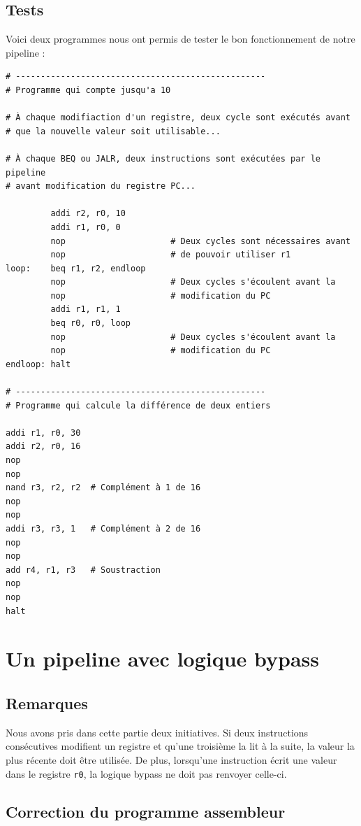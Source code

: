 \documentclass[a4paper]{article}
\begin{document}
\subsection{Tests}
Voici deux programmes nous ont permis de tester le bon fonctionnement de notre pipeline :
\begin{verbatim}
# --------------------------------------------------
# Programme qui compte jusqu'a 10

# À chaque modifiaction d'un registre, deux cycle sont exécutés avant
# que la nouvelle valeur soit utilisable...

# À chaque BEQ ou JALR, deux instructions sont exécutées par le pipeline
# avant modification du registre PC...

         addi r2, r0, 10
         addi r1, r0, 0
         nop                     # Deux cycles sont nécessaires avant
         nop                     # de pouvoir utiliser r1
loop:    beq r1, r2, endloop
         nop                     # Deux cycles s'écoulent avant la
         nop                     # modification du PC
         addi r1, r1, 1
         beq r0, r0, loop
         nop                     # Deux cycles s'écoulent avant la
         nop                     # modification du PC
endloop: halt

# --------------------------------------------------
# Programme qui calcule la différence de deux entiers

addi r1, r0, 30
addi r2, r0, 16
nop
nop
nand r3, r2, r2  # Complément à 1 de 16
nop
nop
addi r3, r3, 1   # Complément à 2 de 16
nop
nop
add r4, r1, r3   # Soustraction
nop
nop
halt
\end{verbatim}

  \section{Un pipeline avec logique bypass}
  
  \subsection{Remarques}
  
  Nous avons pris dans cette partie deux initiatives. Si deux instructions consécutives modifient un registre et qu'une troisième la lit à la suite, la valeur la plus récente doit être utilisée. De plus, lorsqu'une instruction écrit une valeur dans le registre \verb|r0|, la logique bypass ne doit pas renvoyer celle-ci.

  \subsection{Correction du programme assembleur}
  
\end{document}
